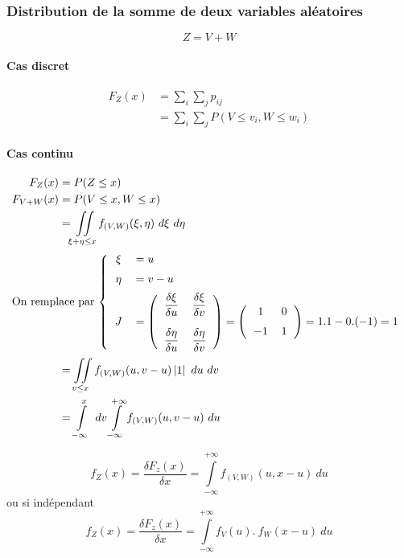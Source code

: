 \newpage
\subsubsection{Distribution de la somme de deux variables aléatoires}
$$\boxed{Z = V+W}$$



\paragraph{Cas discret}
\begin{align*}
    F_Z(x) &= \sum_i\sum_jp_{ij}\\
           &= \sum_i\sum_jP(V \leq v_i,W \leq w_i)
\end{align*}



\paragraph{Cas continu}
\begin{align*}
	F_Z(x)     &= P(Z \leq x)\\
	F_{V+W}(x) &= P(V \leq x, W \leq x) \\
	           &= \iint\limits_{\xi + \eta\leq x} f_{(V,W)}(\xi,\eta)\ d\xi\ d\eta\\
\intertext{On remplace par $\left\{
\begin{tabular}{cl}
	$\xi$  & $= u$\\[0.2cm]
	$\eta$ & $= v-u$\\[0.2cm]
	$J$    & $= \left(\begin{tabular}{cc}$\dfrac{\delta\xi}{\delta u}$&$\dfrac{\delta \xi}{\delta v}$\\[0.5cm]$\dfrac{\delta\eta}{\delta u}$&$\dfrac{\delta\eta}{\delta v}$\end{tabular}\right) = \left(\begin{tabular}{cc}1&0\\[0.2cm]$-1$&$1$\end{tabular}\right) = 1.1-0.(-1) = 1$
\end{tabular}
\right.$}
	&= \iint\limits_{v\leq x} f_{(V,W)}(u,v-u)\left|1\right|\ du\ dv\\
	&= \int\limits_{-\infty}^x\ dv \int\limits_{-\infty}^{+\infty} f_{(V,W)}(u,v-u)\ du
\end{align*}

$$\boxed{f_Z(x) = \frac{\delta F_z(x)}{\delta x} = \int\limits_{-\infty}^{+\infty} f_{(V,W)}(u,x-u)\ du }$$
ou si indépendant
$$\boxed{f_Z(x) = \frac{\delta F_z(x)}{\delta x} = \int\limits_{-\infty}^{+\infty} f_V\left(u\right).\ f_W\left(x-u\right)\ du }$$











